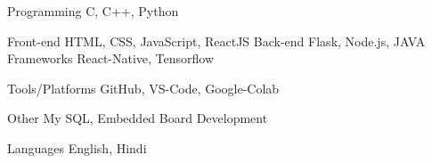 \vspace{1.5mm}
\begin{cvskills}

  \cvskill
    {Programming} %
    {C, C++, Python} %

  \cvskill
    {Front-end} %
    {HTML, CSS, JavaScript, ReactJS} %
  \cvskill
    {Back-end} %
    {Flask, Node.js, JAVA} %
  \cvskill
    {Frameworks} %
    {React-Native, Tensorflow} %

  \cvskill
    {Tools/Platforms } %
    {GitHub, VS-Code, Google-Colab} %

  \cvskill
    {Other} %
    {My SQL, Embedded Board Development} %

  \cvskill
    {Languages} %
    {English, Hindi} %

\end{cvskills}
